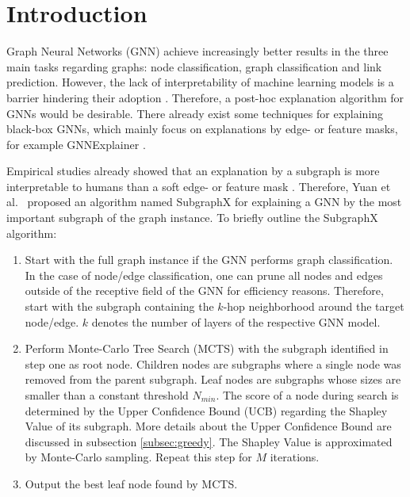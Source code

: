 \section{Introduction}
Graph Neural Networks (GNN) achieve increasingly better results in the three main tasks regarding graphs: node classification, graph classification and link prediction.
However, the lack of interpretability of machine learning models is a barrier hindering their adoption \cite{Molnar19}.
Therefore, a post-hoc explanation algorithm for GNNs would be desirable.
There already exist some techniques for explaining black-box GNNs, which mainly focus on explanations by edge- or feature masks, for example GNNExplainer \cite{Ying19}.

Empirical studies already showed that an explanation by a subgraph is more interpretable to humans than a soft edge- or feature mask \cite{Yuan2021b}. 
Therefore, Yuan et al.\ \cite{Yuan21} proposed an algorithm named SubgraphX for explaining a GNN by the most important subgraph of the graph instance.
To briefly outline the SubgraphX algorithm:
\begin{enumerate}
    \item 
    Start with the full graph instance if the GNN performs graph classification.
    In the case of node/edge classification, one can prune all nodes and edges outside of the receptive field of the GNN for efficiency reasons.
    Therefore, start with the subgraph containing the $k$-hop neighborhood around the target node/edge.
    $k$ denotes the number of layers of the respective GNN model.
    
    \item 
    Perform Monte-Carlo Tree Search (MCTS) \cite{remi07} with the subgraph identified in step one as root node. 
    Children nodes are subgraphs where a single node was removed from the parent subgraph. 
    Leaf nodes are subgraphs whose sizes are smaller than a constant threshold $N_{min}$. 
    The score of a node during search is determined by the Upper Confidence Bound (UCB) regarding the Shapley Value \cite{shapley53} of its subgraph. 
    More details about the Upper Confidence Bound are discussed in subsection \ref{subsec:greedy}.
    The Shapley Value is approximated by Monte-Carlo sampling.
    Repeat this step for $M$ iterations.
    
    \item
    Output the best leaf node found by MCTS.
\end{enumerate}

